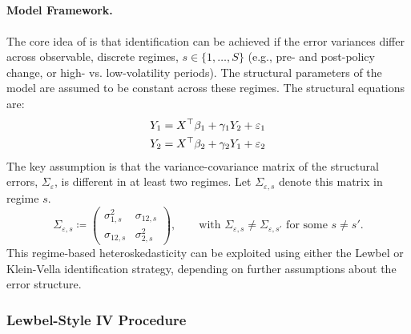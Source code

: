\subsection[Rigobon (2003)]{\textcite{rigobon2003}}

\label{sec:rigobon_application}
\paragraph{Model Framework.}
The core idea of \textcite{rigobon2003} is that identification can be achieved if the error variances differ across observable, discrete regimes, $s \in \{1, \dots, S\}$ (e.g., pre- and post-policy change, or high- vs. low-volatility periods). The structural parameters of the model are assumed to be constant across these regimes. The structural equations are:
\begin{align*}
Y_{1} & =X^{\top}\beta_{1}+\gamma_{1}Y_{2}+\varepsilon_{1}\\
Y_{2} & =X^{\top}\beta_{2}+\gamma_{2}Y_{1}+\varepsilon_{2}
\end{align*}
The key assumption is that the variance-covariance matrix of the structural errors, $\Sigma_{\varepsilon}$, is different in at least two regimes. Let $\Sigma_{\varepsilon, s}$ denote this matrix in regime $s$.
\[
\Sigma_{\varepsilon, s} \coloneqq \begin{pmatrix} \sigma_{1,s}^2 & \sigma_{12,s} \\ \sigma_{12,s} & \sigma_{2,s}^2 \end{pmatrix}, \qquad \text{with } \Sigma_{\varepsilon, s} \neq \Sigma_{\varepsilon, s'} \text{ for some } s \neq s'.
\]
This regime-based heteroskedasticity can be exploited using either the Lewbel or Klein-Vella identification strategy, depending on further assumptions about the error structure.

\subsubsection{Lewbel-Style IV Procedure}
